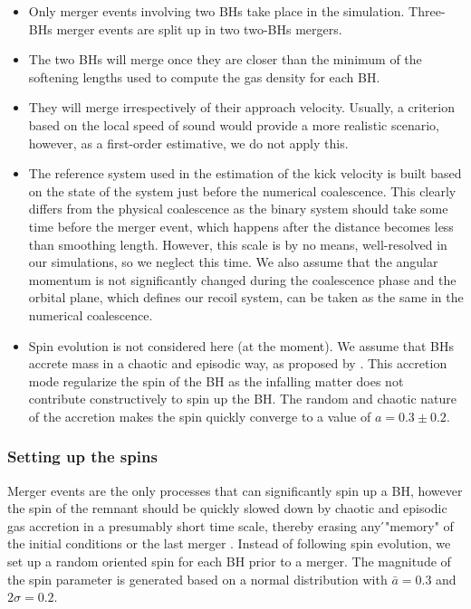 \documentclass[a4,useAMS,usenatbib,usegraphicx,12pt]{article}
\begin{document}
\begin{itemize}
 \item Only merger events involving two BHs take place in the simulation. Three-BHs merger events
 are split up in two two-BHs mergers.
 \item The two BHs will merge once they are closer than the minimum of the softening lengths used to 
 compute the gas density for each BH.
 \item They will merge irrespectively of their approach velocity. Usually, a criterion based on the
 local speed of sound would provide a more realistic scenario, however, as a first-order estimative,
 we do not apply this.
 \item The reference system used in the estimation of the kick velocity is built based on the
 state of the system just before the numerical coalescence. This clearly differs from the physical 
 coalescence as the binary system should take some time before the merger event, which happens after 
 the distance becomes less than smoothing length. However, this scale is by no means, well-resolved 
 in our simulations, so we neglect this time. We also assume that the angular momentum is not 
 significantly changed during the coalescence phase and the orbital plane, which defines our recoil 
 system, can be taken as the same in the numerical coalescence.
 \item Spin evolution is not considered here (at the moment). We assume that BHs accrete mass in a 
 chaotic and episodic way, as proposed by \citet{King2008}. This accretion mode regularize the spin
 of the BH as the infalling matter does not contribute constructively to spin up the BH. The random 
 and chaotic nature of the accretion makes the spin quickly converge to a value of $a = 0.3 \pm 0.2$.
\end{itemize}


\subsubsection{Setting up the spins}

Merger events are the only processes that can significantly spin up a BH, however the spin of the 
remnant should be quickly slowed down by chaotic and episodic gas accretion in a presumably short 
time scale, thereby erasing any ́"memory" of the initial conditions or the last merger \citep{King2008}. 
Instead of following spin evolution, we set up a random oriented spin for each BH prior to a merger.
The magnitude of the spin parameter is generated based on a normal distribution with $\bar{a} = 0.3$ 
and $2\sigma = 0.2$.
\end{document}
